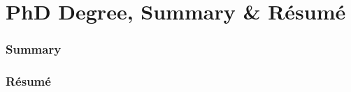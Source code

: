 \documentclass[12pt,twoside]{report}
\begin{document}
\singlespacing


%
\onehalfspacing

\part{PhD Degree, Summary \& Résumé}



{\small
\section*{Summary}

\newpage
\section*{Résumé}

}
\end{document}
